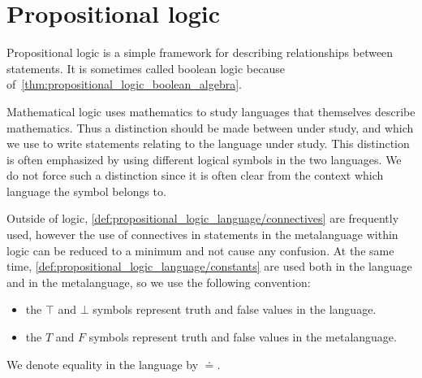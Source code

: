 \section{Propositional logic}\label{sec:propositional_logic}

Propositional logic is a simple framework for describing relationships between statements. It is sometimes called boolean logic because of~\cref{thm:propositional_logic_boolean_algebra}.

\begin{note}\label{note:metalanguage}
  Mathematical logic uses mathematics to study languages that themselves describe mathematics. Thus a distinction should be made between  under study, and  which we use to write statements relating to the language under study. This distinction is often emphasized by using different logical symbols in the two languages. We do not force such a distinction since it is often clear from the context which language the symbol belongs to.

  Outside of logic, \ref{def:propositional_logic_language/connectives} are frequently used, however the use of connectives in statements in the metalanguage within logic can be reduced to a minimum and not cause any confusion. At the same time, \ref{def:propositional_logic_language/constants} are used both in the language and in the metalanguage, so we use the following convention:
  \begin{itemize}
    \item the $\top$ and $\bot$ symbols represent truth and false values in the language.
    \item the $T$ and $F$ symbols represent truth and false values in the metalanguage.
  \end{itemize}

  We denote equality in the language by $\doteq$.
\end{note}

